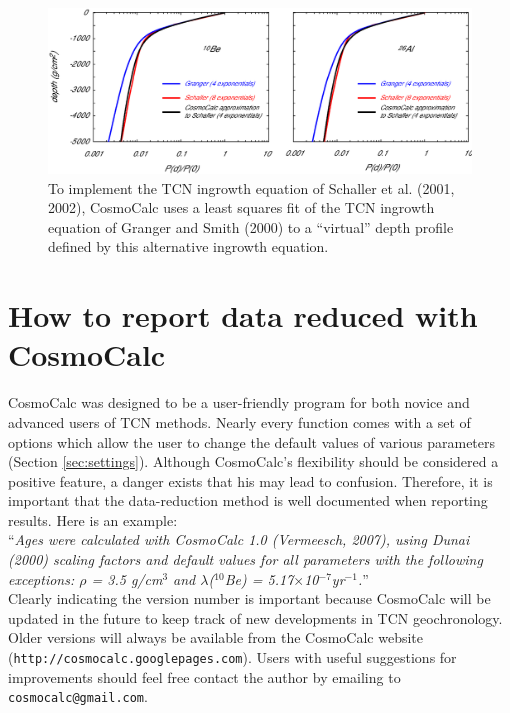 \documentclass{article}
\begin{document}
\begin{figure}[h]
  \centering \includegraphics[width=\textwidth]{2006GC001530-f04_orig.eps}
  \caption{
    To implement the  TCN ingrowth equation of Schaller  et al. (2001,
    2002),  CosmoCalc uses  a least  squares fit  of the  TCN ingrowth
    equation  of  Granger and  Smith  (2000)  to  a ``virtual''  depth
    profile defined by this alternative ingrowth equation.}
  \label{fig:granger2schaller}
\end{figure}

\section{How to report data reduced with CosmoCalc}

CosmoCalc was designed  to be a user-friendly program  for both novice
and advanced users of TCN  methods. Nearly every function comes with a
set of  options which allow the  user to change the  default values of
various parameters (Section \ref{sec:settings}).  Although CosmoCalc's
flexibility should  be considered a positive feature,  a danger exists
that his may  lead to confusion.  Therefore, it  is important that the
data-reduction method is well  documented when reporting results. Here
is an example:
\\

``{\it  Ages were  calculated  with CosmoCalc  1.0 (Vermeesch,  2007),
  using  Dunai  (2000) scaling  factors  and  default  values for  all
  parameters with the following  exceptions: $\rho$ = 3.5 g/cm$^3$ and
  $\lambda$($^{10}$Be) = 5.17$\times$10$^{-7}$yr$^{-1}$.}''
\\

Clearly indicating  the version number is  important because CosmoCalc
will be updated in the future to keep track of new developments in TCN
geochronology.   Older  versions will  always  be  available from  the
CosmoCalc  website (\texttt{http://cosmocalc.googlepages.com}).  Users
with useful suggestions for  improvements should feel free contact the
author by emailing to \texttt{cosmocalc@gmail.com}.
\\
\end{document}
